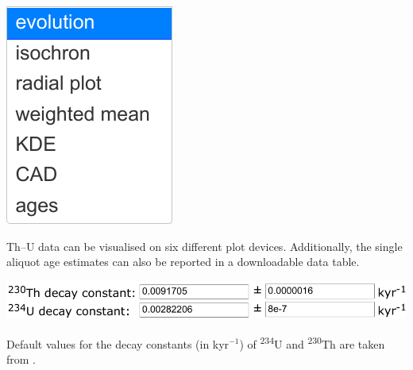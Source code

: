 \begin{refsection}
\noindent\begin{minipage}[t]{.15\linewidth}
\strut\vspace*{-\baselineskip}\newline
\includegraphics[width=\linewidth]{../figures/ThUplotdevices.png}\\
\end{minipage}
\begin{minipage}[t]{.85\linewidth}
Th--U data can be visualised on six different plot devices.
Additionally, the single aliquot age estimates can also be reported in
a downloadable data table.
\end{minipage}

\noindent\begin{minipage}[t]{.6\linewidth}
\strut\vspace*{-\baselineskip}\newline
\includegraphics[width=\linewidth]{../figures/ThUlambda.png}
\end{minipage}
\begin{minipage}[t]{.4\linewidth}
  Default values for the decay constants (in kyr$^{-1}$) of
  \textsuperscript{234}U and \textsuperscript{230}Th are taken from
  \citet{cheng2013}.
\end{minipage}


\end{refsection}
